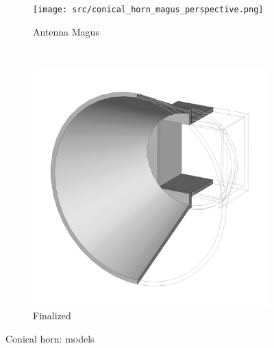 \documentclass[14pt,a4paper]{ntust_report}
\begin{document}
\begin{figure}[!ht]
    \centering
    \begin{subfigure}{.45\textwidth}
        \centering
        \texttt{[image: src/conical\_horn\_magus\_perspective.png]}
        \caption{\label{fig:conical-horn-magus-perspective}Antenna Magus}
    \end{subfigure}
    ~
    \begin{subfigure}{.45\textwidth}
        \centering
        \includegraphics[width=\textwidth]{src/conical_horn_perspective.png}
        \caption{\label{fig:conical-horn-perspective}Finalized}
    \end{subfigure}
    \caption{\label{fig:conical-horn-models}Conical horn: models}
\end{figure}
\end{document}
